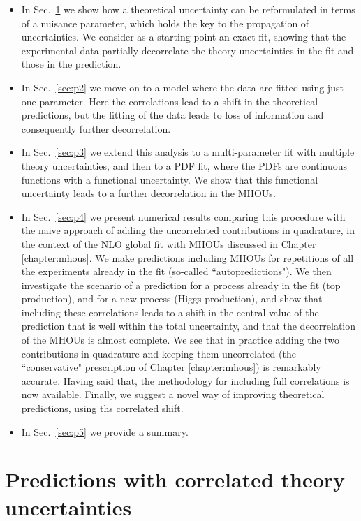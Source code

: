 \begin{itemize}
\item In Sec.~\ref{sec:p1} we show how a theoretical uncertainty can be reformulated in terms of a nuisance parameter, which holds the key to the propagation of uncertainties. We consider as a starting point an exact fit, showing that the experimental data partially decorrelate the theory uncertainties in the fit and those in the prediction.
\item In Sec.~\ref{sec:p2} we move on to a model where the data are fitted using just one parameter. Here the correlations lead to a shift in the theoretical predictions, but the fitting of the data leads to loss of information and consequently further decorrelation.
\item In Sec.~\ref{sec:p3} we extend this analysis to a multi-parameter fit with multiple theory uncertainties, and then to a PDF fit, where the PDFs are continuous functions with a functional uncertainty. We show that this functional uncertainty leads to a further decorrelation in the MHOUs. 
\item In Sec.~\ref{sec:p4} we present numerical results comparing this procedure with the naive approach of adding the uncorrelated contributions in quadrature, in the context of the NLO global fit with MHOUs discussed in Chapter \ref{chapter:mhous}. We make predictions including MHOUs for repetitions of all the experiments already in the fit (so-called ``autopredictions"). We then investigate the scenario of a prediction for a process already in the fit (top production), and for a new process (Higgs production), and show that including these correlations leads to a shift in the central value of the prediction that is well within the total uncertainty, and that the decorrelation of the MHOUs is almost complete. We see that in practice adding the two contributions in quadrature and keeping them uncorrelated (the ``conservative" prescription of Chapter \ref{chapter:mhous}) is remarkably accurate. Having said that, the methodology for including full correlations is now available. Finally, we suggest a novel way of improving theoretical predictions, using ths correlated shift.
\item In Sec.~\ref{sec:p5} we provide a summary.
\end{itemize}

\section{Predictions with correlated theory uncertainties}
\label{sec:p1}

